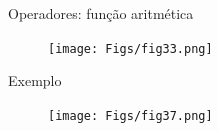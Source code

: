 \documentclass[aspectratio=169]{beamer}
\begin{document}
\begin{frame}{Operadores: função aritmética}
	\justifying
	
	
	\begin{figure}[h]
		\centering
		\texttt{[image: Figs/fig33.png]}
	\end{figure}
	
	
\end{frame}
%	
%	
%	
%	
%	
%	
%	
%	
%	
\begin{frame}{Exemplo}
	\justifying
	
	
	\begin{figure}[h]
		\centering
		\texttt{[image: Figs/fig37.png]}
	\end{figure}
	
	
\end{frame}
\end{document}
